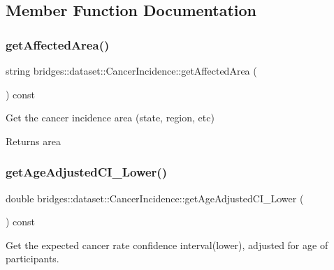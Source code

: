 \subsection{Member Function Documentation}
\mbox{\label{classbridges_1_1dataset_1_1_cancer_incidence_abb62f6d102dc571ab46b633de8365b86}} 
\subsubsection{\texorpdfstring{getAffectedArea()}{getAffectedArea()}}
{\footnotesize\ttfamily string bridges\+::dataset\+::\+Cancer\+Incidence\+::get\+Affected\+Area (\begin{DoxyParamCaption}{ }\end{DoxyParamCaption}) const\hspace{0.3cm}{\ttfamily [inline]}}



Get the cancer incidence area (state, region, etc) 

\begin{DoxyReturn}{Returns}
area 
\end{DoxyReturn}
\mbox{\label{classbridges_1_1dataset_1_1_cancer_incidence_aacd1d64c111c166bfdfc022c03276d16}} 
\subsubsection{\texorpdfstring{getAgeAdjustedCI\_Lower()}{getAgeAdjustedCI\_Lower()}}
{\footnotesize\ttfamily double bridges\+::dataset\+::\+Cancer\+Incidence\+::get\+Age\+Adjusted\+C\+I\+\_\+\+Lower (\begin{DoxyParamCaption}{ }\end{DoxyParamCaption}) const\hspace{0.3cm}{\ttfamily [inline]}}

Get the expected cancer rate confidence interval(lower), adjusted for age of participants.


